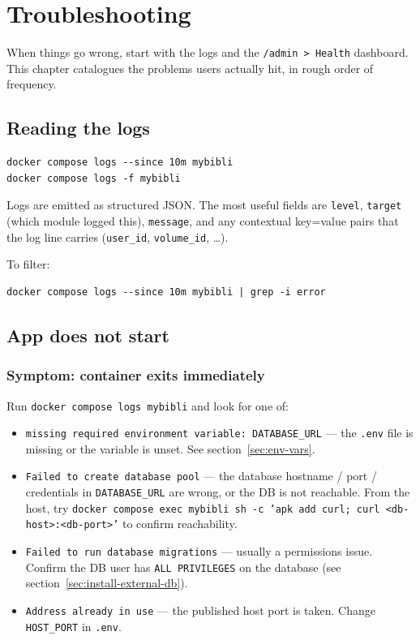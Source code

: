 \chapter{Troubleshooting}
\label{ch:troubleshooting}

When things go wrong, start with the logs and the
\texttt{/admin > Health} dashboard. This chapter catalogues the
problems users actually hit, in rough order of frequency.

\section{Reading the logs}

\begin{lstlisting}
docker compose logs --since 10m mybibli
docker compose logs -f mybibli
\end{lstlisting}

Logs are emitted as structured JSON. The most useful fields are
\texttt{level}, \texttt{target} (which module logged this),
\texttt{message}, and any contextual key=value pairs that the log
line carries (\texttt{user\_id}, \texttt{volume\_id}, \dots).

To filter:

\begin{lstlisting}
docker compose logs --since 10m mybibli | grep -i error
\end{lstlisting}

\section{App does not start}

\subsection*{Symptom: container exits immediately}

Run \texttt{docker compose logs mybibli} and look for one of:

\begin{itemize}
  \item \texttt{missing required environment variable:
        DATABASE\_URL} — the
        \texttt{.env} file is missing or the variable is unset. See
        section~\ref{sec:env-vars}.
  \item \texttt{Failed to create database pool} — the database
        hostname / port / credentials in \texttt{DATABASE\_URL} are
        wrong, or the DB is not reachable. From the host, try
        \texttt{docker compose exec mybibli sh -c 'apk add curl;
        curl <db-host>:<db-port>'} to confirm reachability.
  \item \texttt{Failed to run database migrations} — usually a
        permissions issue. Confirm the DB user has \texttt{ALL
        PRIVILEGES} on the database (see
        section~\ref{sec:install-external-db}).
  \item \texttt{Address already in use} — the published host port
        is taken. Change \texttt{HOST\_PORT} in \texttt{.env}.
\end{itemize}

